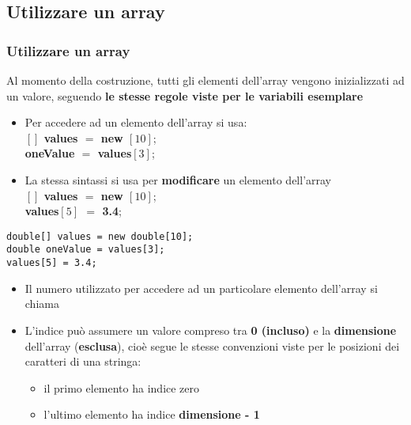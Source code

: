\subsection*{Utilizzare un array}
\begin{frame}
\frametitle{Utilizzare un array}
\begin{block}{}
Al momento della costruzione, tutti gli elementi dell'array vengono inizializzati ad un valore, seguendo \textbf{le stesse regole
viste per le variabili esemplare}
\end{block}
\begin{block}{}
\begin{itemize}
\item Per accedere ad un elemento dell'array si usa:\\
\hspace{0.7cm}\textbf{$\left[\right]$ \alert{values} $=$ new $\left[10\right]$};\\
\hspace{0.7cm}\textbf{ \alert{oneValue} $=$ \alert{values}$\left[3\right]$};
\item La stessa sintassi si usa per \textbf{modificare} un elemento dell'array\\
\hspace{0.7cm}\textbf{$\left[\right]$ \alert{values} $=$ new $\left[10\right]$};\\
\hspace{0.7cm}\textbf{\alert{values}$\left[ 5\right]$ $=$ 3.4};
\end{itemize}
\end{block}
\end{frame}

\begin{frame}[fragile]
\begin{lstlisting}
double[] values = new double[10];
double oneValue = values[3];
values[5] = 3.4;
\end{lstlisting}
\begin{block}{}
\begin{itemize}
\item Il numero utilizzato per accedere ad un particolare elemento dell'array si chiama \textbf{}
\item L'indice può assumere un valore compreso tra \textbf{0 (incluso)} e la \textbf{dimensione} dell'array (\textbf{esclusa}), cioè 
segue le stesse convenzioni viste per le posizioni dei caratteri di una stringa:
\begin{itemize}
\item il primo elemento ha indice zero
\item l'ultimo elemento ha indice \textbf{dimensione - 1}
\end{itemize}
\end{itemize}
\end{block}
\end{frame}


